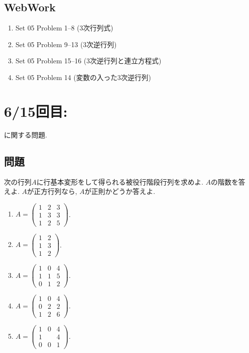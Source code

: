 \subsection{WebWork}
\begin{enumerate}
\item Set 05 Problem 1--8 (3次行列式)
\item Set 05 Problem 9--13 (3次逆行列)
\item Set 05 Problem 15--16 (3次逆行列と連立方程式)
\item Set 05 Problem 14 (変数の入った3次逆行列)
\end{enumerate}

\newpage
\section{6/15回目: }
に関する問題.
\subsection{問題}
\begin{quiz}
  次の行列$A$に行基本変形をして得られる被役行階段行列を求めよ.
  $A$の階数を答えよ. $A$が正方行列なら, $A$が正則かどうか答えよ.
  \begin{enumerate}
  \item $A=\begin{pmatrix}1&2&3\\1&3&3\\1&2&5\end{pmatrix}$.
  \item $A=\begin{pmatrix}1&2\\1&3\\1&2\end{pmatrix}$.
  \item $A=\begin{pmatrix}1&0&4\\1&1&5\\0&1&2\end{pmatrix}$.
  \item $A=\begin{pmatrix}1&0&4\\0&2&2\\1&2&6\end{pmatrix}$.
  \item $A=\begin{pmatrix}1&0&4\\1&&4\\0&0&1\end{pmatrix}$.
  \end{enumerate}
\end{quiz}


